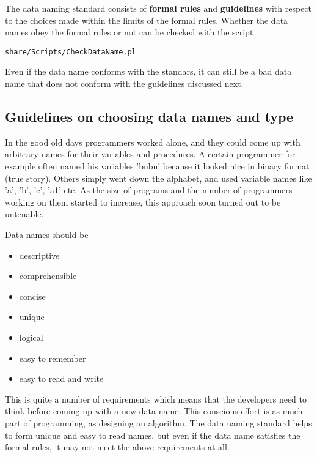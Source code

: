 \documentclass{article}
\begin{document}
The data naming standard consists of {\bf formal rules} and 
{\bf guidelines} with respect to the choices made within 
the limits of the formal rules.
Whether the data names obey the formal rules or not can be checked
with the script
\begin{verbatim}
share/Scripts/CheckDataName.pl
\end{verbatim}
Even if the data name conforms with the standars, it can still be a bad
data name that does not conform with the guidelines discussed next.

\subsection{Guidelines on choosing data names and type}

In the good old days programmers worked alone, and they could come up
with arbitrary names for their variables and procedures. A certain programmer
for example often named his variables 'bubu' because it looked nice in
binary format (true story). Others simply went down the alphabet, and
used variable names like 'a', 'b', 'c', 'a1' etc. As the size of programs 
and the number of programmers working on them started to increase, this
approach soon turned out to be untenable.

Data names should be
\begin{itemize}
\item descriptive
\item comprehensible
\item concise
\item unique
\item logical
\item easy to remember
\item easy to read and write
\end{itemize}
This is quite a number of requirements which means that the developers need
to think before coming up with a new data name. This conscious effort is 
as much part of programming, as designing an algorithm. The data naming
standard helps to form unique and easy to read names, but even if the 
data name satisfies the formal rules, it may not meet the above 
requirements at all.
\end{document}
